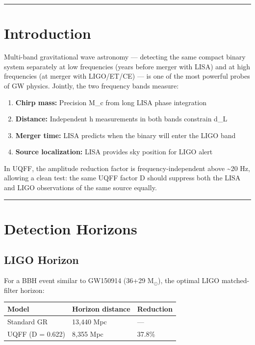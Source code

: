 \documentclass[12pt,a4paper]{article}
\begin{document}
\medskip\hrule\medskip

\section{Introduction}

Multi-band gravitational wave astronomy --- detecting the same compact binary system separately at low frequencies (years before merger with LISA) and at high frequencies (at merger with LIGO/ET/CE) --- is one of the most powerful probes of GW physics. Jointly, the two frequency bands measure:

\begin{enumerate}
  \item \textbf{Chirp mass:} Precision M\_c from long LISA phase integration
  \item \textbf{Distance:} Independent h measurements in both bands constrain d\_L
  \item \textbf{Merger time:} LISA predicts when the binary will enter the LIGO band
  \item \textbf{Source localization:} LISA provides sky position for LIGO alert
\end{enumerate}

In UQFF, the amplitude reduction factor is frequency-independent above \textasciitilde{}20 Hz, allowing a clean test: the same UQFF factor D should suppress both the LISA and LIGO observations of the same source equally.

\medskip\hrule\medskip

\section{Detection Horizons}

\subsection{LIGO Horizon}

For a BBH event similar to GW150914 (36+29 M$_\odot$), the optimal LIGO matched-filter horizon:

\begin{center}
\begin{longtable}{@{}lll@{}}
\toprule
Model & Horizon distance & Reduction \tabularnewline
\midrule
\endhead
Standard GR & 13,440 Mpc & --- \tabularnewline
UQFF (D = 0.622) & 8,355 Mpc & 37.8\% \tabularnewline
\bottomrule
\end{longtable}
\end{center}
\end{document}
